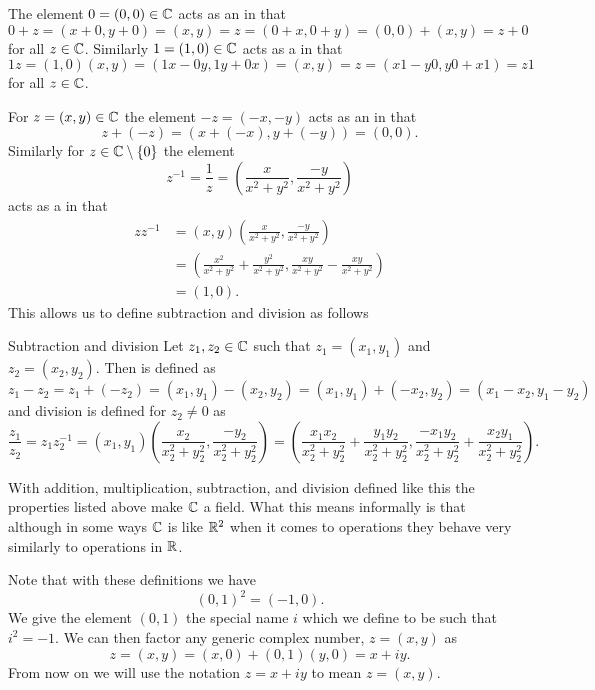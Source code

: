 \documentclass{article}
\begin{document}
    The element \(0 = (0, 0)\in\mathbb{C}\) acts as an  in that
    \[0 + z = (x + 0, y + 0) = (x, y) = z = (0 + x, 0 + y) = (0, 0) + (x, y) = z + 0\]
    for all \(z\in\mathbb{C}\).
    Similarly \(1 = (1, 0)\in\mathbb{C}\) acts as a  in that
    \[1z = (1, 0)(x, y) = (1x - 0y, 1y + 0x) = (x, y) = z = (x1 - y0, y0 + x1) = z1\]
    for all \(z\in\mathbb{C}\).
    
    For \(z = (x, y)\in\mathbb{C}\) the element \(-z = (-x, -y)\) acts as an  in that
    \[z + (-z) = (x + (-x), y + (-y)) = (0, 0).\]
    Similarly for \(z\in\mathbb{C}\setminus\{0\}\) the element 
    \[z^{-1} = \frac{1}{z} = \left( \frac{x}{x^2 + y^2}, \frac{-y}{x^2 + y^2} \right)\]
    acts as a  in that
    \begin{align*}
        zz^{-1} &= (x, y)\left( \frac{x}{x^2 + y^2}, \frac{-y}{x^2 + y^2} \right)\\
        &= \left( \frac{x^2}{x^2 + y^2} + \frac{y^2}{x^2 + y^2}, \frac{xy}{x^2 + y^2} - \frac{xy}{x^2 + y^2} \right)\\
        &= (1, 0).
    \end{align*}
    This allows us to define subtraction and division as follows
    \begin{definition}{Subtraction and division}{}
        Let \(z_1, z_2\in\mathbb{C}\) such that \(z_1 = (x_1, y_1)\) and \(z_2 = (x_2, y_2)\).
        Then  is defined as
        \[z_1 - z_2 = z_1 + (-z_2) = (x_1, y_1) - (x_2, y_2) = (x_1, y_1) + (-x_2, y_2) = (x_1 - x_2, y_1 - y_2)\]
        and division is defined for \(z_2 \ne 0\) as
        \[\frac{z_1}{z_2} = z_1z_2^{-1} = (x_1, y_1)\left( \frac{x_2}{x_2^2 + y_2^2}, \frac{-y_2}{x_2^2 + y_2^2} \right) = \left( \frac{x_1x_2}{x_2^2 + y_2^2} + \frac{y_1y_2}{x_2^2 + y_2^2}, \frac{-x_1y_2}{x_2^2 + y_2^2} + \frac{x_2y_1}{x_2^2 + y_2^2} \right).\]
    \end{definition}
    With addition, multiplication, subtraction, and division defined like this the properties listed above make \(\mathbb{C}\) a field.
    What this means informally is that although in some ways \(\mathbb{C}\) is like \(\mathbb{R}^2\) when it comes to operations they behave very similarly to operations in \(\mathbb{R}\).
    
    Note that with these definitions we have
    \[(0, 1)^2 = (-1, 0).\]
    We give the element \((0, 1)\) the special name \(i\) which we define to be such that \(i^2 = -1\).
    We can then factor any generic complex number, \(z = (x, y)\) as
    \[z = (x, y) = (x, 0) + (0, 1)(y, 0) = x + iy.\]
    From now on we will use the notation \(z = x + iy\) to mean \(z = (x, y)\).
    
\end{document}
